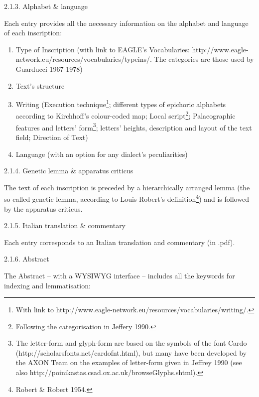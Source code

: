 \documentclass[amsthm,ebook]{saparticle}
\begin{document}
\bigskip

2.1.3. Alphabet \& language


\bigskip

Each entry provides all the necessary information on the alphabet and language of each inscription:

\begin{enumerate}
\item Type of Inscription (with link to EAGLE’s Vocabularies:
http://www.eagle-network.eu/resources/vocabularies/typeins/. The categories are those used by Guarducci 1967-1978)
\item Text’s structure
\item Writing (Execution technique\footnote{ With link to http://www.eagle-network.eu/resources/vocabularies/writing/.};
different types of epichoric alphabets according to Kirchhoff’s colour-coded map; Local script\footnote{ Following the
categorisation in Jeffery 1990.}; Palaeographic features and letters’ form\footnote{ The letter-form and glyph-form are
based on the symbols of the font Cardo (http://scholarsfonts.net/cardofnt.html), but many have been developed by the
AXON Team on the examples of letter-form given in Jeffrey 1990 (see also
http://poinikastas.csad.ox.ac.uk/browseGlyphs.shtml).}; letters’ heights, description and layout of the text field;
Direction of Text)
\item Language (with an option for any dialect’s peculiarities)
\end{enumerate}

\bigskip


\bigskip

2.1.4. Genetic lemma \& apparatus criticus

The text of each inscription is preceded by a hierarchically arranged lemma (the so called genetic lemma, according to
Louis Robert’s definition\footnote{ Robert \& Robert 1954.}) and is followed by the apparatus criticus.


\bigskip

2.1.5. Italian translation \& commentary

Each entry corresponds to an Italian translation and commentary (in .pdf). 


\bigskip

2.1.6. Abstract

The Abstract – with a WYSIWYG interface – includes all the keywords for indexing and lemmatisation:
\end{document}
